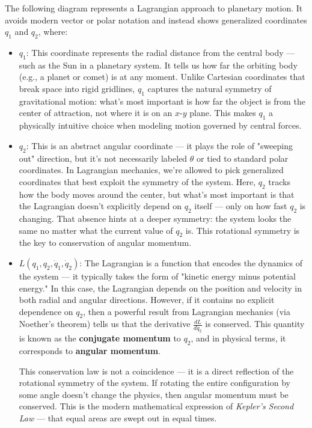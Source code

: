 The following diagram represents a Lagrangian approach to planetary motion. It avoids modern vector or polar notation and instead shows generalized coordinates \( q_1 \) and \( q_2 \), where:

\begin{itemize}
    \item \boldmath\( q_1 \): \unboldmath This coordinate represents the radial distance from the central body — such as the Sun in a planetary system. It tells us how far the orbiting body (e.g., a planet or comet) is at any moment. Unlike Cartesian coordinates that break space into rigid gridlines, \( q_1 \) captures the natural symmetry of gravitational motion: what's most important is how far the object is from the center of attraction, not where it is on an \( x \)-\( y \) plane. This makes \( q_1 \) a physically intuitive choice when modeling motion governed by central forces.

    \item \boldmath\( q_2 \): \unboldmath This is an abstract angular coordinate — it plays the role of "sweeping out" direction, but it’s not necessarily labeled \( \theta \) or tied to standard polar coordinates. In Lagrangian mechanics, we’re allowed to pick generalized coordinates that best exploit the symmetry of the system. Here, \( q_2 \) tracks how the body moves around the center, but what’s most important is that the Lagrangian doesn’t explicitly depend on \( q_2 \) itself — only on how fast \( q_2 \) is changing. That absence hints at a deeper symmetry: the system looks the same no matter what the current value of \( q_2 \) is. This rotational symmetry is the key to conservation of angular momentum.

    \item \boldmath\( L(q_1, q_2, \dot{q}_1, \dot{q}_2) \): \unboldmath The Lagrangian is a function that encodes the dynamics of the system — it typically takes the form of "kinetic energy minus potential energy." In this case, the Lagrangian depends on the position and velocity in both radial and angular directions. However, if it contains no explicit dependence on \( q_2 \), then a powerful result from Lagrangian mechanics (via Noether’s theorem) tells us that the derivative \( \frac{dL}{d\dot{q}_2} \) is conserved. This quantity is known as the \textbf{conjugate momentum} to \( q_2 \), and in physical terms, it corresponds to \textbf{angular momentum}.

    This conservation law is not a coincidence — it is a direct reflection of the rotational symmetry of the system. If rotating the entire configuration by some angle doesn’t change the physics, then angular momentum must be conserved. This is the modern mathematical expression of \textit{Kepler’s Second Law} — that equal areas are swept out in equal times.
\end{itemize}


